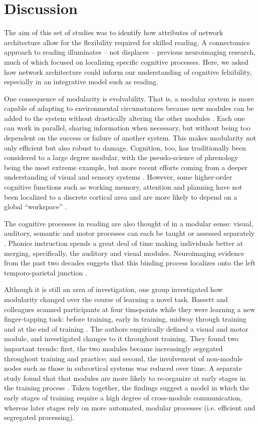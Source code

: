 \chapter{Discussion}

The aim of this set of studies was to identify how attributes of network architecture allow for the flexibility required for skilled reading. A connectomics approach to reading illuminates -- not displaces -- previous neuroimaging research, much of which focused on localizing specific cognitive processes. Here, we asked how network architecture could inform our understanding of cognitive felxibility, especially in an integrative model such as reading. 

One consequence of modularity is evolvability. That is, a modular system is more capable of adapting to environmental circumstances because new modules can be added to the system without drastically altering the other modules \citep{Kashton2005}. Each one can work in parallel, sharing information when necessary, but without being too dependent on the success or failure of another system. This makes modularity not only efficient but also robust to damage. Cognition, too, has traditionally been considered to a large degree modular, with the pseudo-science of phrenology being the most extreme example, but more recent efforts coming from a deeper understanding of visual and sensory systems \citep{Barrett2006}. However, some higher-order cognitive functions such as working memory, attention and planning have not been localized to a discrete cortical area and are more likely to depend on a global ``workspace'' \citep{Dahaene1998}.

The cognitive processes in reading are also thought of in a modular sense: visual, auditory, semantic and motor processes can each be taught or assessed separately \citep{Cutting2009a}. Phonics instruction spends a great deal of time making individuals better at merging, specifically, the auditory and visual modules. Neuroimaging evidence from the past two decades suggets that this binding process localizes onto the left temporo-parietal junction \citep{}. 

Although it is still an area of investigation, one group investigated how modularity changed over the course of learning a novel task. Bassett and colleagues scanned participants at four timepoints while they were learning a new finger-tapping task: before training, early in training, midway through training and at the end of training \citep{Bassett2015}. The authors empirically defined a visual and motor module, and investigated changes to it throughout training. They found two important trends: first, the two modules became increasingly segegated throughout training and practice; and second, the involvement of non-module nodes such as those in subcortical systems was reduced over time. A separate study found that that modules are more likely to re-organize at early stages in the training process \citep{Bassett2011}. Taken together, the findings suggest a model in which the early stages of training require a high degree of cross-module communication, whereas later stages rely on more automated, modular processes (i.e. efficient and segregated processing). 


